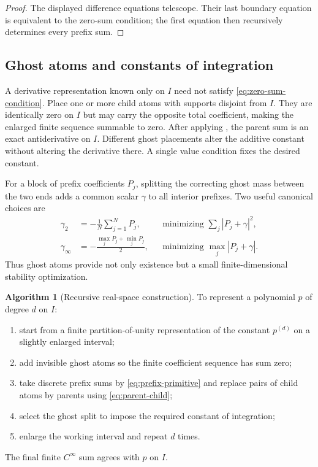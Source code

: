 \documentclass[11pt,oneside]{article}
\theoremstyle{definition}
\newtheorem{algorithm}[theorem]{Algorithm}
\theoremstyle{remark}
\newcommand{\abs}[1]{\left|#1\right|}
\begin{document}
\begin{proof}
The displayed difference equations telescope.  Their last boundary equation
is equivalent to the zero-sum condition; the first equation then recursively
determines every prefix sum.
\end{proof}

\subsection{Ghost atoms and constants of integration}

A derivative representation known only on \(I\) need not satisfy
\eqref{eq:zero-sum-condition}.  Place one or more child atoms with supports
disjoint from \(I\).  They are identically zero on \(I\) but may carry the
opposite total coefficient, making the enlarged finite sequence summable to
zero.  After applying , the parent sum is an exact
antiderivative on \(I\).  Different ghost placements alter the additive
constant without altering the derivative there.  A single value condition
fixes the desired constant.

For a block of prefix coefficients \(P_j\), splitting the correcting ghost
mass between the two ends adds a common scalar \(\gamma\) to all interior
prefixes.  Two useful canonical choices are
\begin{align}
 \gamma_2&=-\frac1N\sum_{j=1}^{N}P_j,
 &&\text{minimizing }\sum_j\abs{P_j+\gamma}^2,
 \label{eq:l2-ghost}\\
 \gamma_\infty&=-\frac{\max_jP_j+\min_jP_j}{2},
 &&\text{minimizing }\max_j\abs{P_j+\gamma}.
 \label{eq:linf-ghost}
\end{align}
Thus ghost atoms provide not only existence but a small finite-dimensional
stability optimization.

\begin{algorithm}[Recursive real-space construction]
\label{alg:antiderivative}
To represent a polynomial \(p\) of degree \(d\) on \(I\):
\begin{enumerate}
  \item start from a finite partition-of-unity representation of the constant
        \(p^{(d)}\) on a slightly enlarged interval;
  \item add invisible ghost atoms so the finite coefficient sequence has sum
        zero;
  \item take discrete prefix sums by \eqref{eq:prefix-primitive} and replace
        pairs of child atoms by parents using \eqref{eq:parent-child};
  \item select the ghost split to impose the required constant of integration;
  \item enlarge the working interval and repeat \(d\) times.
\end{enumerate}
The final finite \(C^\infty\) sum agrees with \(p\) on \(I\).
\end{algorithm}
\end{document}
